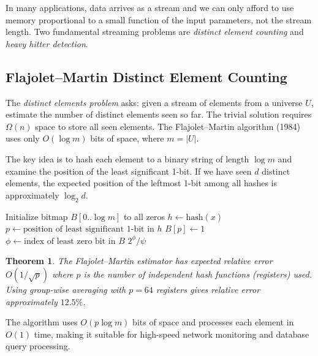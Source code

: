\documentclass[twoside,12pt]{book}
\theoremstyle{plain}
\newtheorem{theorem}{Theorem}[chapter]
\theoremstyle{definition}
\theoremstyle{remark}
\begin{document}
In many applications, data arrives as a stream and we can only afford to use memory proportional to a small function of the input parameters, not the stream length. Two fundamental streaming problems are \emph{distinct element counting} and \emph{heavy hitter detection}.

\subsection{Flajolet--Martin Distinct Element Counting}

The \emph{distinct elements problem} asks: given a stream of elements from a universe $U$, estimate the number of distinct elements seen so far. The trivial solution requires $\Omega(n)$ space to store all seen elements. The Flajolet--Martin algorithm (1984) uses only $O(\log m)$ bits of space, where $m = |U|$.

The key idea is to hash each element to a binary string of length $\log m$ and examine the position of the least significant 1-bit. If we have seen $d$ distinct elements, the expected position of the leftmost 1-bit among all hashes is approximately $\log_2 d$.

\begin{algorithm}[htbp]
\caption{Flajolet--Martin Distinct Element Counting}
\label{alg:flajolet-martin}
\begin{algorithmic}[1]
\State Initialize bitmap $B[0..\log m]$ to all zeros
  \State $h \gets \text{hash}(x)$ 
  \State $p \gets \text{position of least significant 1-bit in } h$
  \State $B[p] \gets 1$
\EndFor
\State $\phi \gets \text{index of least zero bit in } B$
\State \Return $2^\phi / \psi$ 
\end{algorithmic}
\end{algorithm}

\begin{theorem}\label{thm:fm}
The Flajolet--Martin estimator has expected relative error $O(1/\sqrt{p})$ where $p$ is the number of independent hash functions (registers) used. Using group-wise averaging with $p = 64$ registers gives relative error approximately $12.5\%$.
\end{theorem}

The algorithm uses $O(p \log m)$ bits of space and processes each element in $O(1)$ time, making it suitable for high-speed network monitoring and database query processing.
\end{document}

